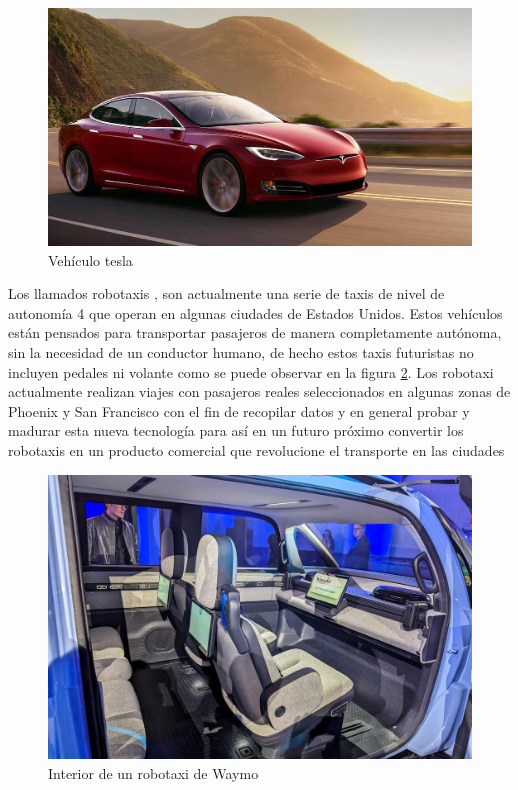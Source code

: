 \newpage

\begin{figure}[h] 
    \centering
    \includegraphics[width=0.7\linewidth]{imagenes/cap1/tesla.jpg} 
    \caption{Vehículo tesla}
    \label{fig:Vehículo tesla} 
\end{figure}


\bigskip

Los llamados robotaxis  \cite{robotaxi} , son actualmente una serie de taxis de nivel de autonomía 4 que operan en algunas ciudades de Estados Unidos. Estos vehículos están pensados para transportar pasajeros de manera completamente autónoma, sin la necesidad de un conductor humano, de hecho estos taxis futuristas no incluyen pedales ni volante como se puede observar en la figura \ref{fig:robotaxi}. Los robotaxi actualmente realizan viajes con pasajeros reales seleccionados en algunas zonas de Phoenix y San Francisco con el fin de recopilar datos y en general probar y madurar esta nueva tecnología para así en un futuro próximo convertir los robotaxis en un producto comercial que revolucione el transporte en las ciudades

\bigskip

\begin{figure}[h] 
    \centering
    \includegraphics[width=0.7\linewidth]{imagenes/cap1/waymo_robotaxi.jpg} 
    \caption{Interior de un robotaxi de Waymo}
    \label{fig:robotaxi}
\end{figure}


